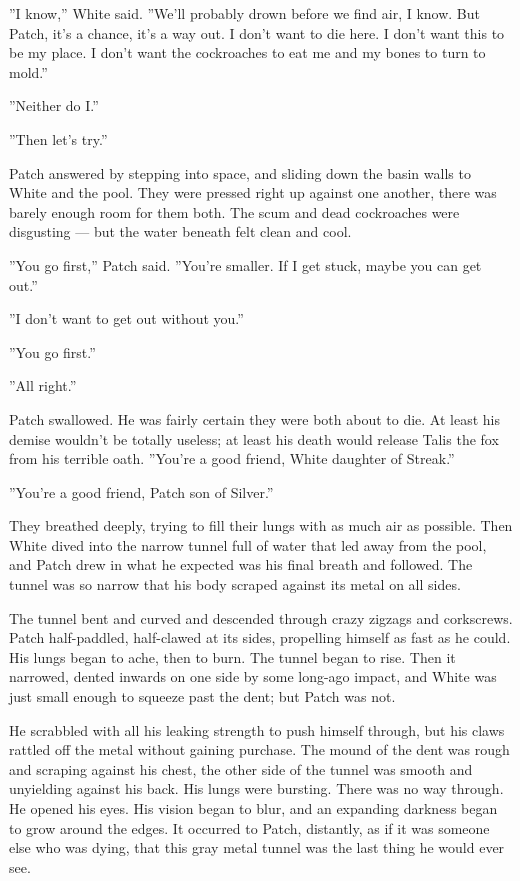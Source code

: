 \documentclass[12pt]{book}
\begin{document}
''I know,'' White said. ''We'll probably drown before we find air, I know. But Patch, it's a chance, it's a way out. I don't want to die here. I don't want this to be my place. I don't want the cockroaches to eat me and my bones to turn to mold.''

''Neither do I.''

''Then let's try.''

Patch answered by stepping into space, and sliding down the basin walls to White and the pool. They were pressed right up against one another, there was barely enough room for them both. The scum and dead cockroaches were disgusting ---
but the water beneath felt clean and cool.

''You go first,'' Patch said. ''You're smaller. If I get stuck, maybe you can get out.''

''I don't want to get out without you.''

''You go first.''

''All right.''

Patch swallowed. He was fairly certain they were both about to die. At least his demise wouldn't be totally useless; at least his death would release Talis the fox from his terrible oath. ''You're a good friend, White daughter of Streak.''

''You're a good friend, Patch son of Silver.''

They breathed deeply, trying to fill their lungs with as much air as possible. Then White dived into the narrow tunnel full of water that led away from the pool, and Patch drew in what he expected was his final breath and followed. The tunnel was so narrow that his body scraped against its metal on all sides.

The tunnel bent and curved and descended through crazy zigzags and corkscrews. Patch half-paddled, half-clawed at its sides, propelling himself as fast as he could. His lungs began to ache, then to burn. The tunnel began to rise. Then it narrowed, dented inwards on one side by some long-ago impact, and White was just small enough to squeeze past the dent; but Patch was not.

He scrabbled with all his leaking strength to push himself through, but his claws rattled off the metal without gaining purchase. The mound of the dent was rough and scraping against his chest, the other side of the tunnel was smooth and unyielding against his back. His lungs were bursting. There was no way through. He opened his eyes. His vision began to blur, and an expanding darkness began to grow around the edges. It occurred to Patch, distantly, as if it was someone else who was dying, that this gray metal tunnel was the last thing he would ever see.
\end{document}
